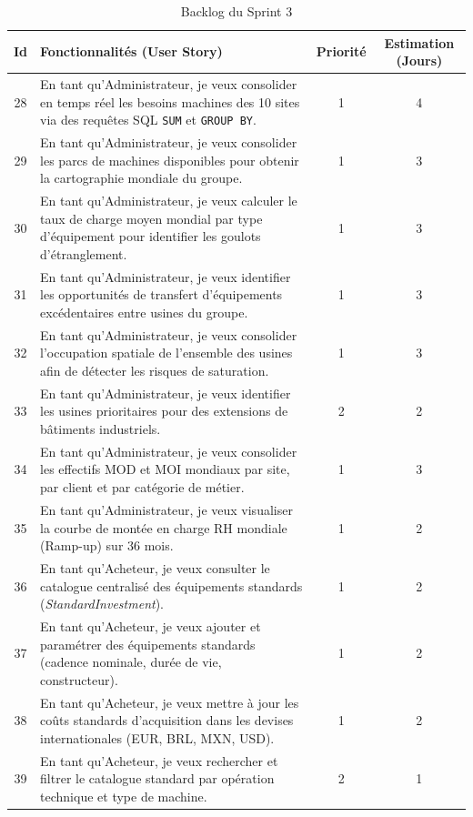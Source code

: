 \begin{table}[H]
\centering
\begin{tabular}{|c|p{9.2cm}|c|c|}
\hline
\textbf{Id} & \textbf{Fonctionnalités (User Story)} & \textbf{Priorité} & \textbf{Estimation (Jours)} \\ \hline
28 & En tant qu'Administrateur, je veux consolider en temps réel les besoins machines des 10 sites via des requêtes SQL \texttt{SUM} et \texttt{GROUP BY}. & 1 & 4 \\ \hline
29 & En tant qu'Administrateur, je veux consolider les parcs de machines disponibles pour obtenir la cartographie mondiale du groupe. & 1 & 3 \\ \hline
30 & En tant qu'Administrateur, je veux calculer le taux de charge moyen mondial par type d'équipement pour identifier les goulots d'étranglement. & 1 & 3 \\ \hline
31 & En tant qu'Administrateur, je veux identifier les opportunités de transfert d'équipements excédentaires entre usines du groupe. & 1 & 3 \\ \hline
32 & En tant qu'Administrateur, je veux consolider l'occupation spatiale de l'ensemble des usines afin de détecter les risques de saturation. & 1 & 3 \\ \hline
33 & En tant qu'Administrateur, je veux identifier les usines prioritaires pour des extensions de bâtiments industriels. & 2 & 2 \\ \hline
34 & En tant qu'Administrateur, je veux consolider les effectifs MOD et MOI mondiaux par site, par client et par catégorie de métier. & 1 & 3 \\ \hline
35 & En tant qu'Administrateur, je veux visualiser la courbe de montée en charge RH mondiale (Ramp-up) sur 36 mois. & 1 & 2 \\ \hline
36 & En tant qu'Acheteur, je veux consulter le catalogue centralisé des équipements standards (\textit{StandardInvestment}). & 1 & 2 \\ \hline
37 & En tant qu'Acheteur, je veux ajouter et paramétrer des équipements standards (cadence nominale, durée de vie, constructeur). & 1 & 2 \\ \hline
38 & En tant qu'Acheteur, je veux mettre à jour les coûts standards d'acquisition dans les devises internationales (EUR, BRL, MXN, USD). & 1 & 2 \\ \hline
39 & En tant qu'Acheteur, je veux rechercher et filtrer le catalogue standard par opération technique et type de machine. & 2 & 1 \\ \hline
\end{tabular}
\caption{Backlog du Sprint 3}
\label{tab:backlog_sprint3}
\end{table}


